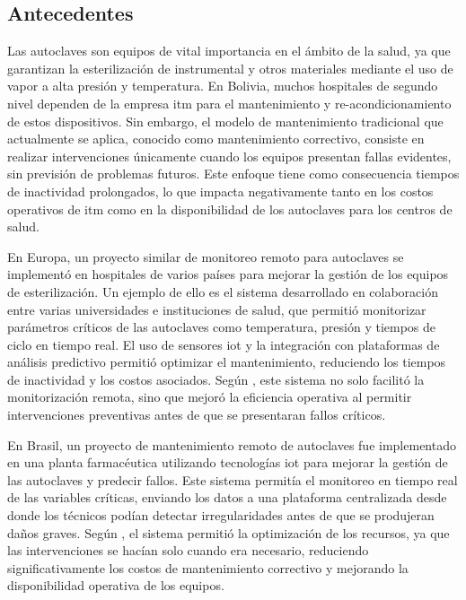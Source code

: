 \subsection*{Antecedentes}
Las autoclaves son equipos de vital importancia en el ámbito de la salud, ya que garantizan la esterilización de instrumental y otros materiales mediante el uso de vapor a alta presión y temperatura. En Bolivia, muchos hospitales de segundo nivel dependen de la empresa \acrshort{itm} para el mantenimiento y re-acondicionamiento de estos dispositivos. Sin embargo, el modelo de mantenimiento tradicional que actualmente se aplica, conocido como mantenimiento correctivo, consiste en realizar intervenciones únicamente cuando los equipos presentan fallas evidentes, sin previsión de problemas futuros. Este enfoque tiene como consecuencia tiempos de inactividad prolongados, lo que impacta negativamente tanto en los costos operativos de \acrshort{itm} como en la disponibilidad de los autoclaves para los centros de salud.

En Europa, un proyecto similar de monitoreo remoto para autoclaves se implementó en hospitales de varios países para mejorar la gestión de los equipos de esterilización. Un ejemplo de ello es el sistema desarrollado en colaboración entre varias universidades e instituciones de salud, que permitió monitorizar parámetros críticos de las autoclaves como temperatura, presión y tiempos de ciclo en tiempo real. El uso de sensores \acrfull{iot} y la integración con plataformas de análisis predictivo permitió optimizar el mantenimiento, reduciendo los tiempos de inactividad y los costos asociados. Según \cite{Lopez2019}, este sistema no solo facilitó la monitorización remota, sino que mejoró la eficiencia operativa al permitir intervenciones preventivas antes de que se presentaran fallos críticos.

En Brasil, un proyecto de mantenimiento remoto de autoclaves fue implementado en una planta farmacéutica utilizando tecnologías \acrshort{iot} para mejorar la gestión de las autoclaves y predecir fallos. Este sistema permitía el monitoreo en tiempo real de las variables críticas, enviando los datos a una plataforma centralizada desde donde los técnicos podían detectar irregularidades antes de que se produjeran daños graves. Según \cite{Santos2020}, el sistema permitió la optimización de los recursos, ya que las intervenciones se hacían solo cuando era necesario, reduciendo significativamente los costos de mantenimiento correctivo y mejorando la disponibilidad operativa de los equipos.

